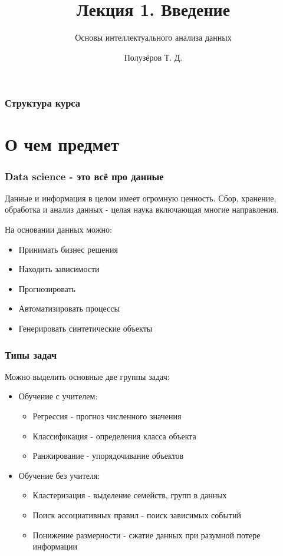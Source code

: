 \documentclass{beamer}
\title{Лекция 1. Введение}
\subtitle{Основы интеллектуального анализа данных}
\author{Полузёров Т. Д.}
\institute{БГУ ФПМИ}
\date{}
\begin{document}
	
	
	\begin{frame}
		\titlepage
	\end{frame}
	
	
	\begin{frame}
		\frametitle{Структура курса}
		\tableofcontents
	\end{frame}


	\section{О чем предмет}
	
	
	\begin{frame}
		\frametitle{Data science - это всё про данные}
		Данные и информация в целом имеет огромную ценность. Сбор, хранение, обработка и анализ данных - целая наука включающая многие направления.
		
		\vspace{15}
		
		На основании данных можно:
		\begin{itemize}
			\item Принимать бизнес решения
			\item Находить зависимости
			\item Прогнозировать
			\item Автоматизировать процессы
			\item Генерировать синтетические объекты
		\end{itemize}
	\end{frame}
	
	
	\begin{frame}
		\frametitle{Типы задач}
		Можно выделить основные две группы задач: 
		
		\begin{itemize}
			\item Обучение с учителем:
			\begin{itemize}
				\item Регрессия - прогноз численного значения 
				\item Классификация - определения класса объекта
				\item Ранжирование - упорядочивание объектов
			\end{itemize}
		
			\item Обучение без учителя:
			\begin{itemize}
				\item Кластеризация - выделение семейств, групп в данных
				\item Поиск ассоциативных правил - поиск зависимых событий
				\item Понижение размерности - сжатие данных при разумной потере информации
			\end{itemize}
		\end{itemize}
	\end{frame}
\end{document}
